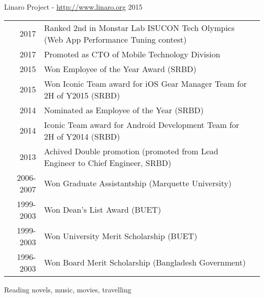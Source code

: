 \documentclass[10pt,a4paper]{article} %
\begin{document}

\spacedhrule{1.6em}{-0.4em} %



\headedsubsection
{Linaro Project - \href{http://www.linaro.org}{http://www.linaro.org}}
{2015}
{}


\spacedhrule{1.6em}{-0.4em} %

\begin{longtable}{rll}
2017	   &    Ranked 2nd in Monstar Lab ISUCON Tech Olympics (Web App Performance Tuning contest) \\
2017   &     Promoted as CTO of Mobile Technology Division \\
2015	   &    Won Employee of the Year Award (SRBD)\\
2015	   &    Won Iconic Team award for iOS Gear Manager Team for 2H of Y2015 (SRBD)\\
2014   &    Nominated as Employee of the Year (SRBD)\\
2014	   &    Iconic Team award for Android Development Team for 2H of Y2014 (SRBD)\\
2013   &    Achived Double promotion (promoted from Lead Engineer to Chief Engineer, SRBD) \\
2006-2007 &    Won Graduate Assistantship (Marquette University)\\
1999-2003 &    Won Dean's List Award (BUET)\\
1999-2003 &    Won University Merit Scholarship (BUET)\\
1996-2003 &    Won Board Merit Scholarship (Bangladesh Government)
\end{longtable}




{Reading novels, music, movies, travelling}
\end{document}
